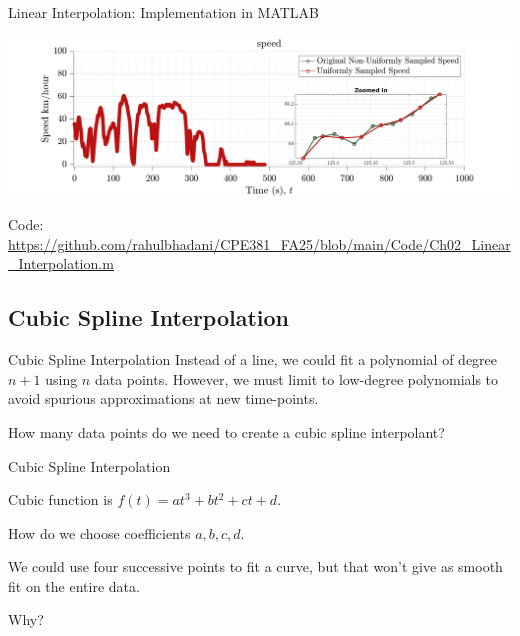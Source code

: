 \documentclass[aspectratio=169,xcolor=dvipsnames,svgnames,x11names,fleqn]{beamer}
\begin{document}
\begin{frame}{Linear Interpolation: Implementation in MATLAB}

\begin{center}

\includegraphics[width=1.0\linewidth]{../Code/figures/Ch02_Linear_Interpolation_Resampling.pdf}

\footnotesize 
Code: \url{https://github.com/rahulbhadani/CPE381_FA25/blob/main/Code/Ch02_Linear_Interpolation.m}
\end{center}
\end{frame}


\subsection{Cubic Spline Interpolation}

\begin{frame}
    \subsectionpage
\end{frame}


\begin{frame}{Cubic Spline Interpolation}
Instead of a line, we could fit a polynomial of degree $n+1$ using $n$ data points. However, we must limit to low-degree polynomials to avoid spurious approximations at new time-points.

\begin{peach}{}
\vspace{10pt}
\begin{center}
How many data points do we need to create a cubic spline interpolant?
\end{center}
\end{peach}

\end{frame}


\begin{frame}{Cubic Spline Interpolation}

Cubic function is $f(t) = at^3 + bt^2 + ct + d$. 

\vspace{10pt}

How do we choose coefficients $a, b, c, d$. 

\vspace{10pt}


We could use four successive points to fit a curve, but that won't give as smooth fit on the entire data.


\begin{center}
\Large Why?
\end{center}

\end{frame}
\end{document}
